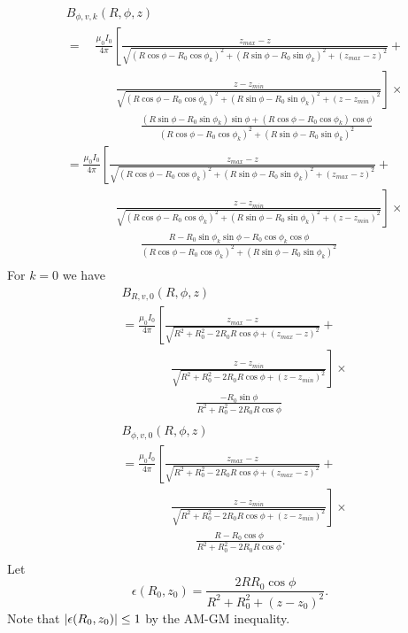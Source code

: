 \documentclass{article}
\begin{document}
\[
\begin{aligned}
    &B_{\phi,v,k}(R, \phi, z) \\
    &=\quad\frac{\mu_0 I_0}{4\pi}\left[\frac{z_{max}-z}{\sqrt{(R\cos\phi-R_0\cos\phi_k)^2+(R\sin\phi-R_0\sin\phi_k)^2+(z_{max}-z)^2}} + \right.\\
    &\qquad\qquad\left.\frac{z-z_{min}}{\sqrt{(R\cos\phi-R_0\cos\phi_k)^2+(R\sin\phi-R_0\sin\phi_k)^2+(z-z_{min})^2}}\right]\times\\
    &\qquad\qquad\qquad\frac{(R\sin\phi-R_0\sin\phi_k)\sin\phi+(R\cos\phi-R_0\cos\phi_k)\cos\phi}{(R\cos\phi-R_0\cos\phi_k)^2+(R\sin\phi-R_0\sin\phi_k)^2} \\
    &=\frac{\mu_0 I_0}{4\pi}\left[\frac{z_{max}-z}{\sqrt{(R\cos\phi-R_0\cos\phi_k)^2+(R\sin\phi-R_0\sin\phi_k)^2+(z_{max}-z)^2}} + \right.\\
    &\qquad\qquad\left.\frac{z-z_{min}}{\sqrt{(R\cos\phi-R_0\cos\phi_k)^2+(R\sin\phi-R_0\sin\phi_k)^2+(z-z_{min})^2}}\right]\times\\
    &\qquad\qquad\qquad\frac{R-R_0\sin\phi_k\sin\phi-R_0\cos\phi_k\cos\phi}{(R\cos\phi-R_0\cos\phi_k)^2+(R\sin\phi-R_0\sin\phi_k)^2} \\
\end{aligned}
\]
For $k=0$ we have
\[
\begin{aligned}
    &B_{R,v,0}(R, \phi, z) \\
   &=\frac{\mu_0 I_0}{4\pi}\left[\frac{z_{max}-z}{\sqrt{R^2+R_0^2-2R_0R\cos\phi+(z_{max}-z)^2}} + \right.\\
    &\qquad\qquad\left.\frac{z-z_{min}}{\sqrt{R^2+R_0^2-2R_0R\cos\phi+(z-z_{min})^2}}\right]\times\\
    &\qquad\qquad\qquad\frac{-R_0\sin\phi}{R^2+R_0^2-2R_0R\cos\phi} \\
\end{aligned}
\]
\[
\begin{aligned}
    &B_{\phi,v,0}(R, \phi, z) \\
   &=\frac{\mu_0 I_0}{4\pi}\left[\frac{z_{max}-z}{\sqrt{R^2+R_0^2-2R_0R\cos\phi+(z_{max}-z)^2}} + \right.\\
    &\qquad\qquad\left.\frac{z-z_{min}}{\sqrt{R^2+R_0^2-2R_0R\cos\phi+(z-z_{min})^2}}\right]\times\\
    &\qquad\qquad\qquad\frac{R-R_0\cos\phi}{R^2+R_0^2-2R_0R\cos\phi}. \\
\end{aligned}
\]
Let
\[\epsilon(R_0, z_0) = \frac{2RR_0\cos\phi}{R^2+R_0^2+(z-z_0)^2}.\]
Note that $\abs{\epsilon(R_0, z_0)} \le 1$ by the AM-GM inequality.
\end{document}
